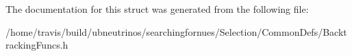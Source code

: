 The documentation for this struct was generated from the following file\+:\begin{DoxyCompactItemize}
\item 
/home/travis/build/ubneutrinos/searchingfornues/\+Selection/\+Common\+Defs/Backtracking\+Funcs.\+h\end{DoxyCompactItemize}
